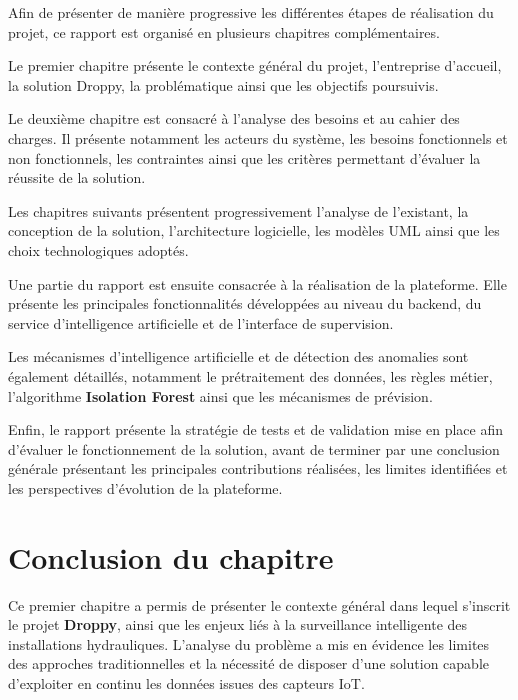 Afin de présenter de manière progressive les différentes étapes de réalisation
du projet, ce rapport est organisé en plusieurs chapitres complémentaires.

Le premier chapitre présente le contexte général du projet, l'entreprise
d'accueil, la solution Droppy, la problématique ainsi que les objectifs
poursuivis.

Le deuxième chapitre est consacré à l'analyse des besoins et au cahier des
charges. Il présente notamment les acteurs du système, les besoins
fonctionnels et non fonctionnels, les contraintes ainsi que les critères
permettant d'évaluer la réussite de la solution.

Les chapitres suivants présentent progressivement l'analyse de l'existant,
la conception de la solution, l'architecture logicielle, les modèles UML
ainsi que les choix technologiques adoptés.

Une partie du rapport est ensuite consacrée à la réalisation de la plateforme.
Elle présente les principales fonctionnalités développées au niveau du
backend, du service d'intelligence artificielle et de l'interface de
supervision.

Les mécanismes d'intelligence artificielle et de détection des anomalies
sont également détaillés, notamment le prétraitement des données, les règles
métier, l'algorithme \textbf{Isolation Forest} ainsi que les mécanismes de
prévision.

Enfin, le rapport présente la stratégie de tests et de validation mise en
place afin d'évaluer le fonctionnement de la solution, avant de terminer
par une conclusion générale présentant les principales contributions
réalisées, les limites identifiées et les perspectives d'évolution de
la plateforme.


\section*{Conclusion du chapitre}


Ce premier chapitre a permis de présenter le contexte général dans lequel
s'inscrit le projet \textbf{Droppy}, ainsi que les enjeux liés à la
surveillance intelligente des installations hydrauliques. L'analyse du
problème a mis en évidence les limites des approches traditionnelles et la
nécessité de disposer d'une solution capable d'exploiter en continu les
données issues des capteurs IoT.

